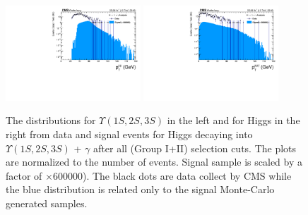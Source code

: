 \begin{figure}[!htbp]
\begin{center}
\includegraphics[width=0.45\textwidth]{figures_and_tables/outputPlots/HtoUpsilon_Cat0_ZZZZZ/nEvts/data_x_mc/withKinCuts/h_withKin_Upsilon_Pt}\hspace*{1.cm}
\includegraphics[width=0.45\textwidth]{figures_and_tables/outputPlots/HtoUpsilon_Cat0_ZZZZZ/nEvts/data_x_mc/withKinCuts/h_withKin_Z_Pt}
\end{center}\vspace*{-.5cm}
\caption{The \PT distributions for $\Upsilon(1S,2S,3S)$ in the left and for Higgs in the right from data and signal events for Higgs decaying into $\Upsilon(1S,2S,3S)$ + $\gamma$ after all (Group I+II) selection cuts. The plots are normalized to the number of events. Signal sample is scaled by a factor of $\times 600000$). The black dots are data collect by CMS while the blue distribution is related only to the signal Monte-Carlo generated samples.}
\label{fig:pTUpsilon_and_Higgs_HtoUpsilon_Cat0_groupI_plus_II}
\end{figure}


